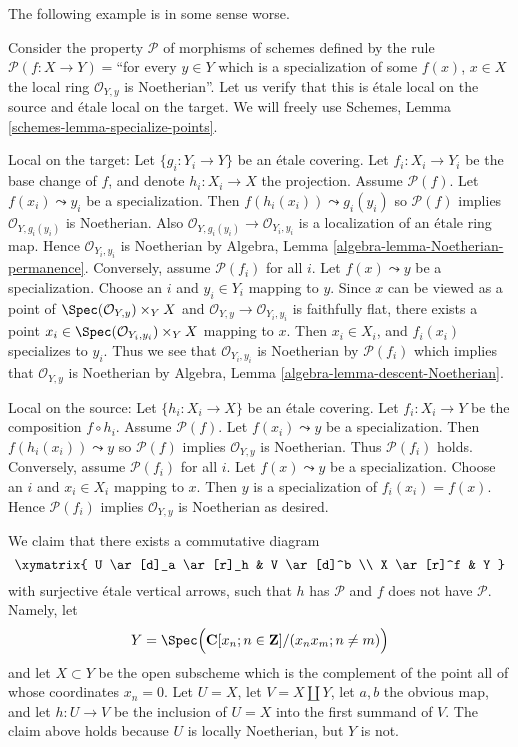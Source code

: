 \noindent
The following example is in some sense worse.

\begin{example}
\label{example-silly-two}
Consider the property $\mathcal{P}$ of morphisms of schemes defined
by the rule $\mathcal{P}(f : X \to Y) = $``for every $y \in Y$ which is
a specialization of some $f(x)$, $x \in X$ the local ring
$\mathcal{O}_{Y, y}$ is Noetherian''. Let us verify that this is
\'etale local on the source and \'etale local on the target. We will freely use
Schemes, Lemma \ref{schemes-lemma-specialize-points}.

\medskip\noindent
Local on the target:
Let $\{g_i : Y_i \to Y\}$ be an \'etale covering. Let $f_i : X_i \to Y_i$
be the base change of $f$, and denote $h_i : X_i \to X$ the projection.
Assume $\mathcal{P}(f)$. Let $f(x_i) \leadsto y_i$
be a specialization. Then $f(h_i(x_i)) \leadsto g_i(y_i)$ so
$\mathcal{P}(f)$ implies $\mathcal{O}_{Y, g_i(y_i)}$ is Noetherian.
Also $\mathcal{O}_{Y, g_i(y_i)} \to \mathcal{O}_{Y_i, y_i}$ is a
localization of an \'etale ring map.
Hence $\mathcal{O}_{Y_i, y_i}$ is Noetherian by
Algebra, Lemma \ref{algebra-lemma-Noetherian-permanence}.
Conversely, assume $\mathcal{P}(f_i)$ for all $i$. Let $f(x) \leadsto y$
be a specialization. Choose an $i$ and $y_i \in Y_i$ mapping to $y$.
Since $x$ can be viewed as a point of
$\Spec(\mathcal{O}_{Y, y}) \times_Y X$ and
$\mathcal{O}_{Y, y} \to \mathcal{O}_{Y_i, y_i}$ is faithfully flat,
there exists a point
$x_i \in \Spec(\mathcal{O}_{Y_i, y_i}) \times_Y X$
mapping to $x$. Then $x_i \in X_i$, and $f_i(x_i)$ specializes to $y_i$.
Thus we see that $\mathcal{O}_{Y_i, y_i}$ is Noetherian by
$\mathcal{P}(f_i)$ which implies that $\mathcal{O}_{Y, y}$ is
Noetherian by
Algebra, Lemma \ref{algebra-lemma-descent-Noetherian}.

\medskip\noindent
Local on the source:
Let $\{h_i : X_i \to X\}$ be an \'etale covering. Let $f_i : X_i \to Y$
be the composition $f \circ h_i$. Assume $\mathcal{P}(f)$. Let
$f(x_i) \leadsto y$ be a specialization. Then $f(h_i(x_i)) \leadsto y$ so
$\mathcal{P}(f)$ implies $\mathcal{O}_{Y, y}$ is Noetherian. Thus
$\mathcal{P}(f_i)$ holds.
Conversely, assume $\mathcal{P}(f_i)$ for all $i$. Let $f(x) \leadsto y$
be a specialization. Choose an $i$ and $x_i \in X_i$ mapping to $x$.
Then $y$ is a specialization of $f_i(x_i) = f(x)$. Hence
$\mathcal{P}(f_i)$ implies $\mathcal{O}_{Y, y}$ is Noetherian
as desired.

\medskip\noindent
We claim that there exists a commutative diagram
$$
\xymatrix{
U \ar[d]_a \ar[r]_h & V \ar[d]^b \\
X \ar[r]^f & Y
}
$$
with surjective \'etale vertical arrows, such that $h$ has $\mathcal{P}$
and $f$ does not have $\mathcal{P}$. Namely, let
$$
Y =
\Spec\Big(
\mathbf{C}[x_n; n \in \mathbf{Z}]/(x_n x_m; n \not = m)
\Big)
$$
and let $X \subset Y$ be the open subscheme which is the complement of
the point all of whose coordinates $x_n = 0$. Let $U = X$, let
$V = X \amalg Y$, let $a, b$ the obvious map, and let $h : U \to V$
be the inclusion of $U = X$ into the first summand of $V$. The claim above
holds because $U$ is locally Noetherian, but $Y$ is not.
\end{example}

